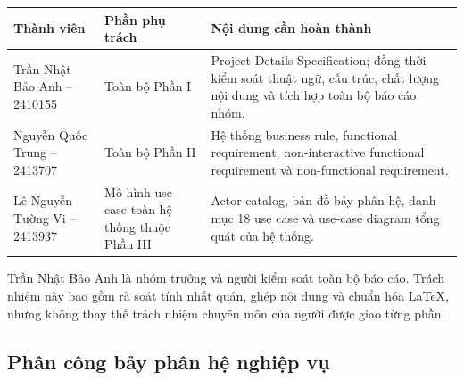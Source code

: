 \documentclass[10pt,a4paper]{article}
\begin{document}
\begin{table}[htbp]
  \centering
  \small
  \begin{tabularx}{\textwidth}{|L{45mm}|L{40mm}|Y|}
    \hline
    \centering\arraybackslash\textbf{Thành viên} &
    \centering\arraybackslash\textbf{Phần phụ trách} &
    \centering\arraybackslash\textbf{Nội dung cần hoàn thành}\\
    \hline
    Trần Nhật Bảo Anh -- 2410155 &
    Toàn bộ Phần I &
    Project Details Specification; đồng thời kiểm soát thuật ngữ, cấu trúc, chất lượng nội dung và tích hợp toàn bộ báo cáo nhóm.\\
    \hline
    Nguyễn Quốc Trung -- 2413707 &
    Toàn bộ Phần II &
    Hệ thống business rule, functional requirement, non-interactive functional requirement và non-functional requirement.\\
    \hline
    Lê Nguyễn Tường Vi -- 2413937 &
    Mô hình use case toàn hệ thống thuộc Phần III &
    Actor catalog, bản đồ bảy phân hệ, danh mục 18 use case và use-case diagram tổng quát của hệ thống.\\
    \hline
  \end{tabularx}
\end{table}

\noindent Trần Nhật Bảo Anh là nhóm trưởng và người kiểm soát toàn bộ báo cáo. Trách nhiệm này bao gồm rà soát tính nhất quán, ghép nội dung và chuẩn hóa LaTeX, nhưng không thay thế trách nhiệm chuyên môn của người được giao từng phần.

\subsection{Phân công bảy phân hệ nghiệp vụ}
\end{document}

